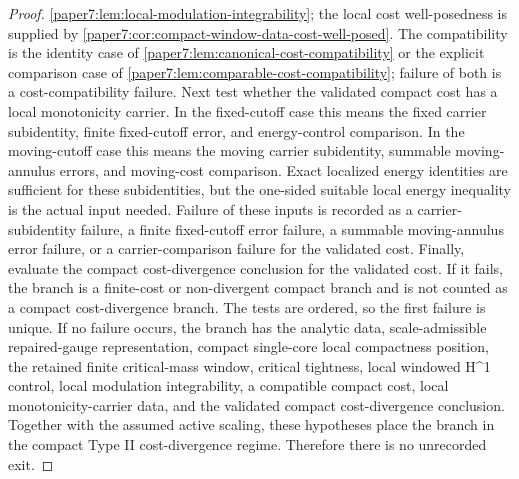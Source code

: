 \documentclass[11pt]{amsart}
\def\({}%
\def\){}%
\theoremstyle{plain}
\theoremstyle{definition}
\theoremstyle{remark}
\begin{document}
\begin{proof}
\cref{paper7:lem:local-modulation-integrability}; the local cost
well-posedness is supplied by
\cref{paper7:cor:compact-window-data-cost-well-posed}.  The compatibility is
the identity case of \cref{paper7:lem:canonical-cost-compatibility} or the
explicit comparison case of
\cref{paper7:lem:comparable-cost-compatibility}; failure of both is a
cost-compatibility failure.  Next test whether the validated compact cost has a
local monotonicity carrier.  In the fixed-cutoff case this means the fixed
carrier subidentity, finite fixed-cutoff error, and energy-control comparison.
In the moving-cutoff case this means the moving carrier subidentity, summable
moving-annulus errors, and moving-cost comparison.  Exact localized energy
identities are sufficient for these subidentities, but the one-sided suitable
local energy inequality is the actual input needed.  Failure of these inputs is
recorded as a carrier-subidentity failure, a finite fixed-cutoff error failure,
a summable moving-annulus error failure, or a carrier-comparison failure for
the validated cost.
Finally, evaluate the compact cost-divergence conclusion for the validated cost.
If it fails, the branch is a finite-cost or non-divergent compact branch and is
not counted as a compact cost-divergence branch.  The tests are ordered, so the
first failure is unique.  If no failure occurs, the branch has the analytic data,
scale-admissible repaired-gauge representation, compact single-core
local compactness position, the retained finite critical-mass window, critical
tightness, local windowed \(H^1\) control, local modulation integrability, a
compatible compact cost, local monotonicity-carrier data, and the validated
compact cost-divergence conclusion.  Together with the assumed active scaling,
these hypotheses place the branch in the compact Type II cost-divergence
regime.
Therefore there is no unrecorded exit.
\end{proof}
\end{document}
